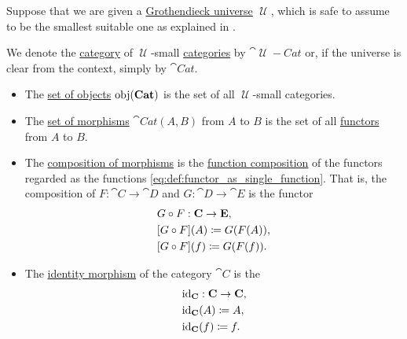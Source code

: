 \begin{definition}\label{def:category_of_small_categories}
  Suppose that we are given a \hyperref[def:grothendieck_universe]{Grothendieck universe} \( \mscrU \), which is safe to assume to be the smallest suitable one as explained in .

  We denote the \hyperref[def:category]{category} of \( \mscrU \)-small \hyperref[def:category]{categories} by \( \cat{\mscrU-Cat} \) or, if the universe is clear from the context, simply by \( \cat{Cat} \).

  \begin{itemize}
    \item The \hyperref[def:category/objects]{set of objects} \( \operatorname{obj}(\operatorname{\mathbf{Cat}}) \) is the set of all \( \mscrU \)-small categories.

    \item The \hyperref[def:category/morphisms]{set of morphisms} \( \cat{Cat}(A, B) \) from \( A \) to \( B \) is the set of all \hyperref[def:functor]{functors} from \( A \) to \( B \).

    \item The \hyperref[def:category/composition]{composition of morphisms} is the \hyperref[def:multi_valued_function/composition]{function composition} of the functors regarded as the functions \eqref{eq:def:functor_as_single_function}. That is, the composition of \( F: \cat{C} \to \cat{D} \) and \( G: \cat{D} \to \cat{E} \) is the functor
    \begin{equation}\label{eq:def:category_of_small_categories/composition}
      \begin{aligned}
        &G \mathbin \circ F: \operatorname{\mathbf{C}} \to \operatorname{\mathbf{E}}, \\
        &[G \mathbin \circ F](A) \coloneqq G(F(A)), \\
        &[G \mathbin \circ F](f) \coloneqq G(F(f)).
      \end{aligned}
    \end{equation}

    \item The \hyperref[def:category/identity]{identity morphism} of the category \( \cat{C} \) is the 
    \begin{equation}\label{eq:def:category_of_small_categories/identity}
      \begin{aligned}
        &\operatorname{id}_{\operatorname{\mathbf{C}}}: \operatorname{\mathbf{C}} \to \operatorname{\mathbf{C}}, \\
        &\operatorname{id}_{\operatorname{\mathbf{C}}}(A) \coloneqq A, \\
        &\operatorname{id}_{\operatorname{\mathbf{C}}}(f) \coloneqq f.
      \end{aligned}
    \end{equation}
  \end{itemize}
\end{definition}
